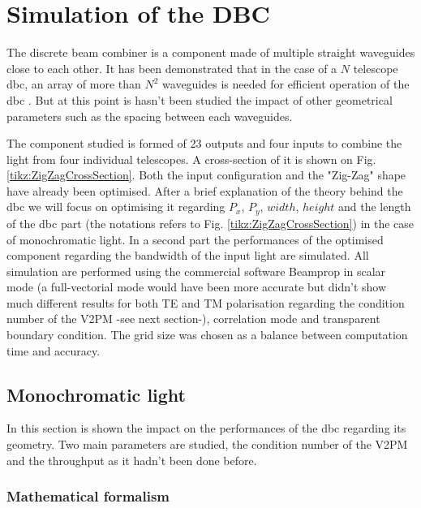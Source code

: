 \documentclass[a4paper,twoside,11pt]{article}
\begin{document}
\section{Simulation of the DBC}
    
    The discrete beam combiner is a component made of multiple straight waveguides close to each other. It has been demonstrated that in the case of a $N$ telescope \gls{dbc}, an array of more than $N^2$ waveguides is needed for efficient operation of the \gls{dbc} \cite{minardi1}. But at this point is hasn't been studied the impact of other geometrical parameters such as the spacing between each waveguides. 
    
    The component studied is formed of 23 outputs and four inputs to combine the light from four individual telescopes. A cross-section of it is shown on Fig. \ref{tikz:ZigZagCrossSection}. Both the input configuration and the "Zig-Zag" shape have already been optimised. After a brief explanation of the theory behind the \gls{dbc} we will focus on optimising it regarding $P_x$, $P_y$, $width$, $height$ and the length of the \gls{dbc} part (the notations refers to Fig. \ref{tikz:ZigZagCrossSection}) in the case of monochromatic light. In a second part the performances of the optimised component regarding the bandwidth of the input light are simulated. All simulation are performed using the commercial software Beamprop\textcompwordmark{} in scalar mode (a full-vectorial mode would have been more accurate but didn't show much different results for both TE and TM polarisation regarding the condition number of the \gls{V2PM} -see next section-), correlation mode and transparent boundary condition. The grid size was chosen as a balance between computation time and accuracy.
    

    \subsection{Monochromatic light}

    In this section is shown the impact on the performances of the \gls{dbc} regarding its geometry. Two main parameters are studied, the condition number of the \gls{V2PM} and the throughput as it hadn't been done before. 
        \subsubsection{Mathematical formalism}
        
        
\end{document}
